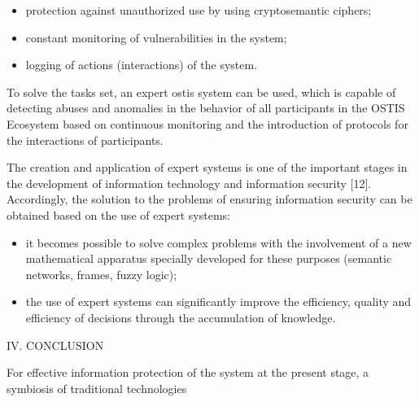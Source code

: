 \documentclass{article}
\begin{document}
\begin{multicols}{2}
\begin{itemize}
  
    \item  protection against unauthorized use by using cryptosemantic ciphers;
         \item constant monitoring of vulnerabilities in the system;
         \item  logging of actions (interactions) of the system.

  \end{itemize}
To solve the tasks set, an expert ostis system can be
used, which is capable of detecting abuses and anomalies
in the behavior of all participants in the OSTIS Ecosystem
based on continuous monitoring and the introduction of
protocols for the interactions of participants.
\par
The creation and application of expert systems is one
of the important stages in the development of information
technology and information security [12]. Accordingly,
the solution to the problems of ensuring information
security can be obtained based on the use of expert
systems:
\begin{itemize}
    \item it becomes possible to solve complex problems with
the involvement of a new mathematical apparatus
specially developed for these purposes (semantic
networks, frames, fuzzy logic);



    \item the use of expert systems can significantly improve
the efficiency, quality and efficiency of decisions
through the accumulation of knowledge.


  \end{itemize}
\begin{center}
IV. CONCLUSION
\end{center}
For effective information protection of the system at
the present stage, a symbiosis of traditional technologies
\end{multicols}
\newpage
\end{document}

